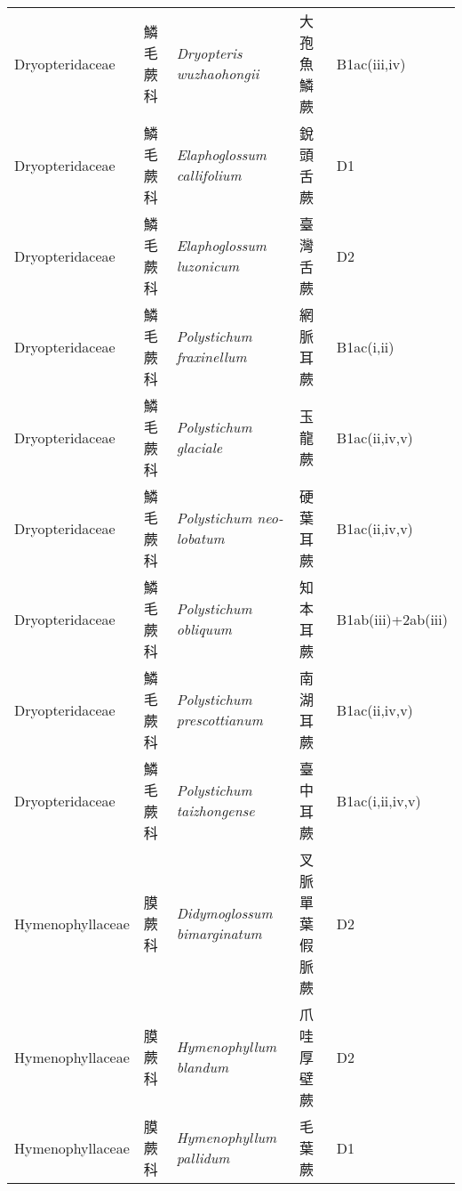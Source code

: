 {\begin{longtable}{p{2.5cm}p{2.5cm}p{4.5cm}p{2.5cm}p{3cm}}
    Dryopteridaceae & 鱗毛蕨科 & \textit{Dryopteris wuzhaohongii}  & 大孢魚鱗蕨 & B1ac(iii,iv) \index{Dryopteris@\textit{Dryopteris}!wuzhaohongii@\textit{wuzhaohongii}}  \index{大孢魚鱗蕨} \\
    Dryopteridaceae & 鱗毛蕨科 & \textit{Elaphoglossum callifolium}  & 銳頭舌蕨 & D1 \index{Elaphoglossum@\textit{Elaphoglossum}!callifolium@\textit{callifolium}}  \index{銳頭舌蕨} \\
    Dryopteridaceae & 鱗毛蕨科 & \textit{Elaphoglossum luzonicum}  & 臺灣舌蕨 & D2 \index{Elaphoglossum@\textit{Elaphoglossum}!luzonicum@\textit{luzonicum}}  \index{臺灣舌蕨} \\
    Dryopteridaceae & 鱗毛蕨科 & \textit{Polystichum fraxinellum}  & 網脈耳蕨 & B1ac(i,ii) \index{Polystichum@\textit{Polystichum}!fraxinellum@\textit{fraxinellum}}  \index{網脈耳蕨} \\
    Dryopteridaceae & 鱗毛蕨科 & \textit{Polystichum glaciale}  & 玉龍蕨 & B1ac(ii,iv,v) \index{Polystichum@\textit{Polystichum}!glaciale@\textit{glaciale}}  \index{玉龍蕨} \\
    Dryopteridaceae & 鱗毛蕨科 & \textit{Polystichum neo-lobatum}  & 硬葉耳蕨 & B1ac(ii,iv,v) \index{Polystichum@\textit{Polystichum}!neo-lobatum@\textit{neo-lobatum}}  \index{硬葉耳蕨} \\
    Dryopteridaceae & 鱗毛蕨科 & \textit{Polystichum obliquum}  & 知本耳蕨 & B1ab(iii)+2ab(iii) \index{Polystichum@\textit{Polystichum}!obliquum@\textit{obliquum}}  \index{知本耳蕨} \\
    Dryopteridaceae & 鱗毛蕨科 & \textit{Polystichum prescottianum}  & 南湖耳蕨 & B1ac(ii,iv,v) \index{Polystichum@\textit{Polystichum}!prescottianum@\textit{prescottianum}}  \index{南湖耳蕨} \\
    Dryopteridaceae & 鱗毛蕨科 & \textit{Polystichum taizhongense}  & 臺中耳蕨 & B1ac(i,ii,iv,v) \index{Polystichum@\textit{Polystichum}!taizhongense@\textit{taizhongense}}  \index{臺中耳蕨} \\
    Hymenophyllaceae & 膜蕨科 & \textit{Didymoglossum bimarginatum}  & 叉脈單葉假脈蕨 & D2 \index{Didymoglossum@\textit{Didymoglossum}!bimarginatum@\textit{bimarginatum}}  \index{叉脈單葉假脈蕨} \\
    Hymenophyllaceae & 膜蕨科 & \textit{Hymenophyllum blandum}  & 爪哇厚壁蕨 & D2 \index{Hymenophyllum@\textit{Hymenophyllum}!blandum@\textit{blandum}}  \index{爪哇厚壁蕨} \\
    Hymenophyllaceae & 膜蕨科 & \textit{Hymenophyllum pallidum}  & 毛葉蕨 & D1 \index{Hymenophyllum@\textit{Hymenophyllum}!pallidum@\textit{pallidum}}  \index{毛葉蕨} \\

\end{longtable}}
